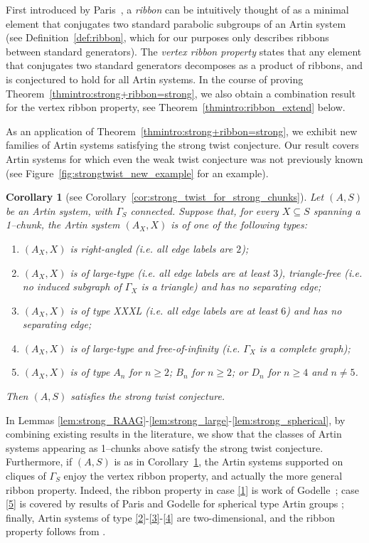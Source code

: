 \documentclass[svgnames]{amsart}
\theoremstyle{plain}
\newtheorem{corintro}[thmintro]{Corollary}
\theoremstyle{definition}
\begin{document}
First introduced by Paris~\cite{Pparabolics}, a \emph{ribbon} can be intuitively thought of as a minimal element that conjugates two standard parabolic subgroups of an Artin system (see Definition~\ref{def:ribbon}, which for our purposes only describes ribbons between standard generators). The \emph{vertex ribbon property} states that any element that conjugates two standard generators decomposes as a product of ribbons, and is conjectured to hold for all Artin systems. In the course of proving Theorem~\ref{thmintro:strong+ribbon=strong}, we also obtain a combination result for the vertex ribbon property, see Theorem~\ref{thmintro:ribbon_extend} below.




As an application of Theorem~\ref{thmintro:strong+ribbon=strong}, we exhibit new families of Artin systems satisfying the strong twist conjecture. Our result covers Artin systems for which even the weak twist conjecture was not previously known (see Figure~\ref{fig:strongtwist_new_example} for an example).
\begin{corintro}[see Corollary~\ref{cor:strong_twist_for_strong_chunks}]\label{corintro:strong_twist_for_strong_chunks}
Let $(A,S)$ be an Artin system, with $\Gamma_S$ connected. Suppose that, for every $X\subseteq S$ spanning a 1--chunk, the Artin system $(A_X,X)$ is of one of the following types:
\begin{enumerate}
\item\label{1} $(A_X,X)$ is right-angled (i.e. all edge labels are $2$);
\item\label{2} $(A_X,X)$ is of large-type (i.e. all edge labels are at least $3$), triangle-free (i.e. no induced subgraph of $\Gamma_X$ is a triangle) and has no separating edge;
\item\label{4} $(A_X,X)$ is of type XXXL (i.e. all edge labels are at least $6$) and has no separating edge;
\item\label{3} $(A_X,X)$ is of large-type and free-of-infinity (i.e. $\Gamma_X$ is a complete graph);
\item\label{5} $(A_X,X)$ is of type $A_n$ for $n \geq 2$; $B_n$ for $n \geq 2$; or $D_n$ for $n \geq 4$ and $n \neq 5$.
\end{enumerate}
Then $(A,S)$ satisfies the strong twist conjecture.
\end{corintro}


In Lemmas \ref{lem:strong_RAAG}-\ref{lem:strong_large}-\ref{lem:strong_spherical}, by combining existing results in the literature, we show that the classes of Artin systems appearing as 1--chunks above satisfy the strong twist conjecture. Furthermore, if $(A,S)$ is as in Corollary~\ref{corintro:strong_twist_for_strong_chunks}, the Artin systems supported on cliques of $\Gamma_S$ enjoy the vertex ribbon property, and actually the more general ribbon property. Indeed, the ribbon property in case \eqref{1} is work of Godelle~\cite{godelle2003parabolic}; case \eqref{5} is covered by results of Paris and Godelle for spherical type Artin groups \cite{Pparabolics, godelle2002normalisateurs}; finally, Artin systems of type \eqref{2}-\eqref{3}-\eqref{4} are two-dimensional, and the ribbon property follows from \cite{godelle2007artin}.
\end{document}
